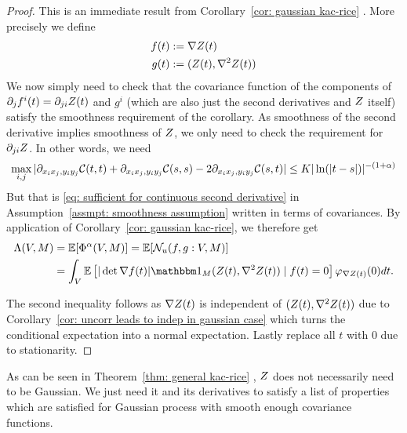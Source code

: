 \begin{proof}
	This is an immediate result from Corollary~\ref{cor: gaussian kac-rice}
	\parencite[Corollary~11.2.2]{adlerRandomFieldsGeometry2007}. More precisely
	we define
	\begin{align*}
		f(t) &:= \nabla Z(t)\\
		g(t) &:= (Z(t), \nabla^2 Z(t))
	\end{align*}
	We now simply need to check that the covariance function of the components of
	\(\partial_j f^i(t) = \partial_{ji} Z(t)\) and \(g^i\) (which are
	also just the second derivatives and \(Z\) itself) satisfy the smoothness
	requirement of the corollary. As smoothness of the second derivative implies
	smoothness of \(Z\), we only need to check the requirement for \(\partial_{ji} Z\).
	In other words, we need
	\[
		\max_{i,j}|\partial_{x_i x_j, y_i y_j}\mathcal{C}(t,t)
		+ \partial_{x_i x_j, y_i y_j}\mathcal{C}(s,s)
		-2\partial_{x_i x_j, y_i y_j}\mathcal{C}(s,t)| \le K |\ln(|t-s|)|^{-(1+\alpha)}
	\]
	But that is \eqref{eq: sufficient for continuous second derivative} in
	Assumption~\ref{assmpt: smoothness assumption} written in terms of
	covariances. By application
	of Corollary~\ref{cor: gaussian kac-rice}, we therefore get
	\begin{align*}
		\Lambda(\Vol, M) 
		&= \E[\crit^\alpha(\Vol, M)]
		= \E[\level(f, g: \Vol, M)]\\
		&= \int_\Vol \E\left[
			|\det \nabla f(t)| \ind_M(\rf(t), \nabla^2\rf(t)) \mid f(t) = 0
		\right] \density_{\nabla\rf(t)}(0)dt.
	\end{align*}
	
	
	The second inequality follows as \(\nabla Z(t)\) is independent of
	\((Z(t),\nabla^2Z(t))\) due to Corollary~\ref{cor: uncorr leads to indep
	in gaussian case} which turns the conditional expectation into a normal
	expectation. Lastly replace all \(t\) with \(0\) due to stationarity.
\end{proof}
\begin{remark}
	As can be seen in Theorem~\ref{thm: general kac-rice} \parencite[Theorem
	11.2.1]{adlerRandomFieldsGeometry2007}, \(Z\) does not necessarily
	need to be Gaussian. We just need it and its derivatives to satisfy a
	list of properties which are satisfied for Gaussian process with
	smooth enough covariance functions.
\end{remark}

